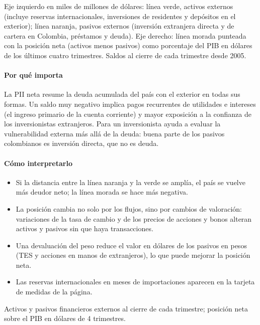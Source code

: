 \begin{leer}
Eje izquierdo en miles de millones de dólares: línea verde, activos externos (incluye reservas internacionales, inversiones de residentes y depósitos en el exterior); línea naranja, pasivos externos (inversión extranjera directa y de cartera en Colombia, préstamos y deuda). Eje derecho: línea morada punteada con la posición neta (activos menos pasivos) como porcentaje del PIB en dólares de los últimos cuatro trimestres. Saldos al cierre de cada trimestre desde 2005.
\end{leer}

\paragraph{Por qué importa}
La PII neta resume la deuda acumulada del país con el exterior en todas sus formas. Un saldo muy negativo implica pagos recurrentes de utilidades e intereses (el ingreso primario de la cuenta corriente) y mayor exposición a la confianza de los inversionistas extranjeros. Para un inversionista ayuda a evaluar la vulnerabilidad externa más allá de la deuda: buena parte de los pasivos colombianos es inversión directa, que no es deuda.

\paragraph{Cómo interpretarlo}
\begin{itemize}
\item Si la distancia entre la línea naranja y la verde se amplía, el país se vuelve más deudor neto; la línea morada se hace más negativa.
\item La posición cambia no solo por los flujos, sino por cambios de valoración: variaciones de la tasa de cambio y de los precios de acciones y bonos alteran activos y pasivos sin que haya transacciones.
\item Una devaluación del peso reduce el valor en dólares de los pasivos en pesos (TES y acciones en manos de extranjeros), lo que puede mejorar la posición neta.
\item Las reservas internacionales en meses de importaciones aparecen en la tarjeta de medidas de la página.
\end{itemize}
\begin{formulas}[Fórmulas]
\end{formulas}
\begin{metodo}[Metodología]
Activos y pasivos financieros externos al cierre de cada trimestre; posición neta sobre el PIB en dólares de 4 trimestres.
\par{}
\end{metodo}

